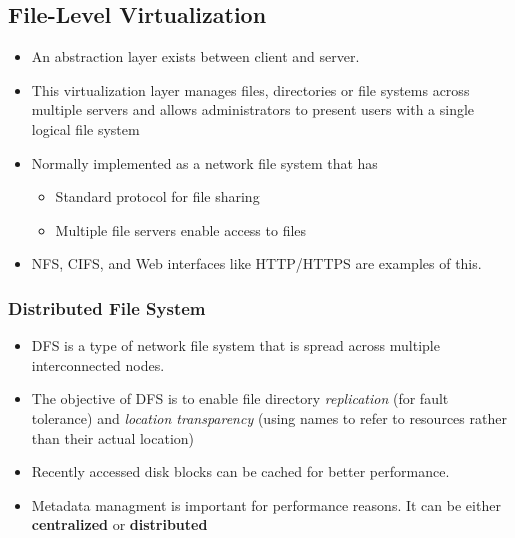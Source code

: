 \documentclass{article}
\begin{document}
\subsection{File-Level Virtualization}
\begin{itemize}
    \item An abstraction layer exists between client and server. 
    
    \item This virtualization layer manages files, directories or file systems across multiple servers and allows administrators to present users with a single logical file system
    
    \item Normally implemented as a network file system that has 
    \begin{itemize}
        \item Standard protocol for file sharing
        
        \item Multiple file servers enable access to files 
    \end{itemize}
    
    \item NFS, CIFS, and Web interfaces like HTTP/HTTPS are examples of this.
\end{itemize}

\subsubsection{Distributed File System}
\begin{itemize}
    \item DFS is a type of network file system that is spread across multiple interconnected nodes. 
    
    \item The objective of DFS is to enable file directory \textit{replication} (for fault tolerance) and\textit{ location transparency} (using names to refer to resources rather than their actual location)
    
    \item Recently accessed disk blocks can be cached for better performance. 
    
    \item Metadata managment is important for performance reasons. It can be either \textbf{centralized} or \textbf{distributed}
\end{itemize}
\end{document}
